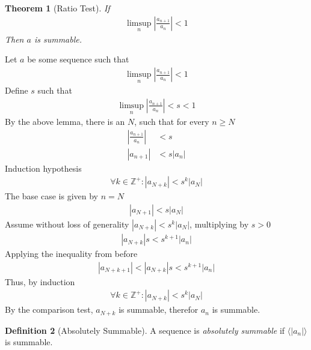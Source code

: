 \documentclass{amsart}
\numberwithin{equation}{section}
\let\oldendproof\endproof
\renewenvironment{proof}[1][\proofname]{%
  \setcounter{case}{0}
  \setcounter{step}{0}
  \oldproof[#1]%
}{\oldendproof}
\theoremstyle{plain}
\newtheorem{theorem}{Theorem}[section]
\theoremstyle{definition}
\newtheorem{definition}[theorem]{Definition}
\theoremstyle{remark}
\begin{document}
\begin{theorem}[Ratio Test]
  If 
  \begin{align}
    \limsup_n \left|\frac{a_{n+1}}{a_n}\right| < 1
  \end{align}
  Then $a$ is summable.
\end{theorem}
\begin{proof}
  Let $a$ be some sequence such that
  \begin{align}
    \limsup_n \left|\frac{a_{n+1}}{a_n} \right|< 1
  \end{align}
  Define $s$ such that
  \begin{align}
    \limsup_n \left|\frac{a_{n+1}}{a_n} \right|< s< 1
  \end{align}
  By the above lemma, there is an $N$, such that for every $n\geq N$
  \begin{align}
    \left|\frac{a_{n+1}}{a_n}\right| &< s\\
    \left|a_{n+1} \right|&< s |a_n|
  \end{align}
  Induction hypothesis
  \begin{align}
    \forall k \in\mathbb{Z}^+: |a_{N+k} | < s^k | a_N |
  \end{align}
  The base case is given by $n = N$
  \begin{align}
    |a_{N+1} | < s | a_N|
  \end{align}
  Assume without loss of generality $|a_{N+k}| < s^k |a_N|$, multiplying by $s>0$
  \begin{align}
    |a_{N+k} | s < s^{k+1} |a_n|
  \end{align}
  Applying the inequality from before
  \begin{align}
    |a_{N+k+1} | < |a_{N+k} | s < s^{k+1} |a_n|
  \end{align}
  Thus, by induction
  \begin{align}
    \forall k \in\mathbb{Z}^+: |a_{N+k} | < s^k | a_N |
  \end{align}
  By the comparison test, $a_{N+k}$ is summable, therefor $a_n$ is summable.
\end{proof}

\begin{definition}[Absolutely Summable]
  A sequence is \emph{absolutely summable} if $\langle |a_n| \rangle$ is summable.
\end{definition}
\end{document}
